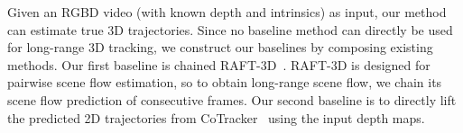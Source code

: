 Given an RGBD video (with known depth and intrinsics) as input, our method can estimate true 3D trajectories. Since no baseline method can directly be used for long-range 3D tracking, we construct our baselines by composing existing methods. Our first baseline is chained RAFT-3D~\cite{raft3D}. RAFT-3D is designed for pairwise scene flow estimation, so to obtain long-range scene flow, we chain its scene flow prediction of consecutive frames. Our second baseline is to directly lift the predicted 2D trajectories from CoTracker~\cite{cotracker} using the input depth maps. 

